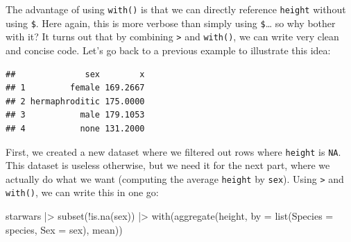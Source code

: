 \documentclass[
]{article}
\newenvironment{Shaded}{\begin{snugshade}}{\end{snugshade}}
\newcommand{\AttributeTok}[1]{\textcolor[rgb]{0.77,0.63,0.00}{#1}}
\newcommand{\FunctionTok}[1]{\textcolor[rgb]{0.00,0.00,0.00}{#1}}
\newcommand{\NormalTok}[1]{#1}
\newcommand{\OtherTok}[1]{\textcolor[rgb]{0.56,0.35,0.01}{#1}}
\newcommand{\SpecialCharTok}[1]{\textcolor[rgb]{0.00,0.00,0.00}{#1}}
\begin{document}
The advantage of using \texttt{with()} is that we can directly reference \texttt{height} without using \texttt{\$}. Here again, this
is more verbose than simply using \texttt{\$}\ldots{} so why bother with it? It turns out that by combining \texttt{\textbar{}\textgreater{}} and \texttt{with()},
we can write very clean and concise code. Let's go back to a previous example to illustrate this idea:

\begin{Shaded}
\end{Shaded}

\begin{verbatim}
##              sex        x
## 1         female 169.2667
## 2 hermaphroditic 175.0000
## 3           male 179.1053
## 4           none 131.2000
\end{verbatim}

First, we created a new dataset where we filtered out rows where \texttt{height} is \texttt{NA}. This dataset is useless otherwise,
but we need it for the next part, where we actually do what we want (computing the average \texttt{height} by \texttt{sex}).
Using \texttt{\textbar{}\textgreater{}} and \texttt{with()}, we can write this in one go:

\begin{Shaded}
\begin{Highlighting}[]
\NormalTok{starwars }\SpecialCharTok{|\textgreater{}}
  \FunctionTok{subset}\NormalTok{(}\SpecialCharTok{!}\FunctionTok{is.na}\NormalTok{(sex)) }\SpecialCharTok{|\textgreater{}}
  \FunctionTok{with}\NormalTok{(}\FunctionTok{aggregate}\NormalTok{(height,}
                 \AttributeTok{by =} \FunctionTok{list}\NormalTok{(}\AttributeTok{Species =}\NormalTok{ species,}
                           \AttributeTok{Sex =}\NormalTok{ sex),}
\NormalTok{                 mean))}
\end{Highlighting}
\end{Shaded}
\end{document}
